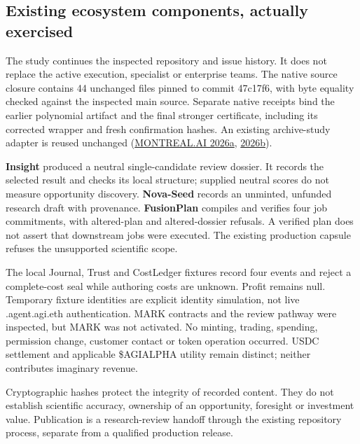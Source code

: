 \documentclass[11pt,a4paper]{article}
\renewcommand{\texttt}[1]{{\ttfamily\small #1}}
\begin{document}

\hypertarget{existing-ecosystem-components-actually-exercised}{%
\subsection{Existing ecosystem components, actually
exercised}\label{existing-ecosystem-components-actually-exercised}}

The study continues the inspected repository and issue history. It does
not replace the active execution, specialist or enterprise teams. The
native source closure contains 44 unchanged files pinned to commit
\texttt{47c17f6}, with byte equality checked against the inspected main
source. Separate native receipts bind the earlier polynomial artifact
and the final stronger certificate, including its corrected wrapper and
fresh confirmation hashes. An existing archive-study adapter is reused
unchanged (\protect\hyperlink{ref-coordination2026}{MONTREAL.AI 2026a},
\protect\hyperlink{ref-archive2026}{2026b}).

\textbf{Insight} produced a neutral single-candidate review dossier. It
records the selected result and checks its local structure; supplied
neutral scores do not measure opportunity discovery. \textbf{Nova-Seed}
records an unminted, unfunded research draft with provenance.
\textbf{FusionPlan} compiles and verifies four job commitments, with
altered-plan and altered-dossier refusals. A verified plan does not
assert that downstream jobs were executed. The existing production
capsule refuses the unsupported scientific scope.

The local Journal, Trust and CostLedger fixtures record four events and
reject a complete-cost seal while authoring costs are unknown. Profit
remains null. Temporary fixture identities are explicit identity
simulation, not live \texttt{*.agent.agi.eth} authentication. MARK
contracts and the review pathway were inspected, but MARK was not
activated. No minting, trading, spending, permission change, customer
contact or token operation occurred. USDC settlement and applicable
\$AGIALPHA utility remain distinct; neither contributes imaginary
revenue.

Cryptographic hashes protect the integrity of recorded content. They do
not establish scientific accuracy, ownership of an opportunity,
foresight or investment value. Publication is a research-review handoff
through the existing repository process, separate from a qualified
production release.
\end{document}
